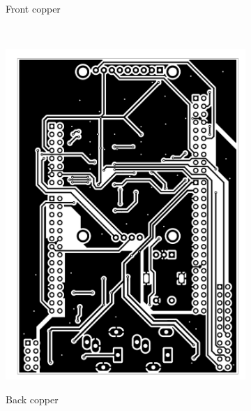 \documentclass[a4paper,twoside,12pt]{book}
\begin{document}
\begin{figure}[H]
\begin{subfigure}[h]{0.273\textwidth}
        \label{fig:board1}
        \caption{Front copper}
    \end{subfigure}
    ~
    \begin{subfigure}[h]{0.273\textwidth}
        \includegraphics[width=\textwidth]{images/Board_back}
        \label{fig:board2}
        \caption{Back copper}
    \end{subfigure}
    ~
    \begin{subfigure}[h]{0.273\textwidth}

\end{subfigure}
\end{figure}
\end{document}

